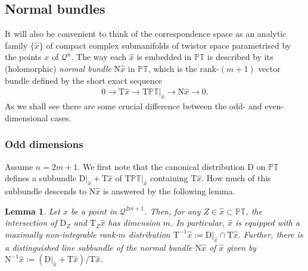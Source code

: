 \documentclass[pdftex]{sigma}
\numberwithin{equation}{section}
\newtheorem{Lemma}[Theorem]{Lemma}
\newcommand{\mc} [1]{\mathcal{#1}}
\newcommand{\Tgt} {\mathrm{T}}
\newcommand{\Nrm} {\mathrm{N}}
\newcommand{\PT} {\mathbb{PT}}
\begin{document}
\subsection{Normal bundles}\label{sec-normal}
It will also be convenient to think of the correspondence space as an analytic family $\{ \hat{x} \}$ of compact complex submanifolds of twistor space parametrised by the points $x$ of $\mc{Q}^n$. The way each $\hat{x}$ is embedded in $\PT$ is described by its (holomorphic) \emph{normal bundle} $\Nrm \hat{x}$ in
$\PT$, which is the rank-$(m+1)$ vector bundle def\/ined by the short exact sequence
\begin{gather*}
0 \rightarrow \Tgt \hat{x} \rightarrow \Tgt \left. \PT \right|_{\hat{x}} \rightarrow \Nrm \hat{x} \rightarrow 0 .
\end{gather*}
As we shall see there are some crucial dif\/ference between the odd- and even-dimensional cases.

\subsubsection{Odd dimensions}\label{sec-important}
Assume $n=2m+1$. We f\/irst note that the canonical distribution $\mathrm{D}$ on $\PT$ def\/ines a subbundle $\mathrm{D} |_{\hat{x}} + \Tgt \hat{x}$ of $\Tgt \PT |_{\hat{x}}$ containing $\Tgt \hat{x}$. How much of this subbundle descends to $\Nrm \hat{x}$ is answered by the following lemma.
\begin{Lemma}\label{lem-D-Nx}
Let $x$ be a point in $\mc{Q}^{2m+1}$. Then, for any $Z \in \hat{x} \subset \PT$, the intersection of $\mathrm{D}_Z$ and $\Tgt_Z \hat{x}$ has dimension $m$. In particular, $\hat{x}$ is equipped with a maximally non-integrable rank-$m$ distribution $\Tgt^{-1} \hat{x} := \mathrm{D} |_{\hat{x}} \cap \Tgt \hat{x}$. Further, there is a distinguished line subbundle of the normal bundle $\mathrm{N} \hat{x}$ of $\hat{x}$ given by $\Nrm^{-1} \hat{x} := ( \mathrm{D} |_{\hat{x}} + \Tgt \hat{x})/\Tgt \hat{x}$.
\end{Lemma}
\end{document}
